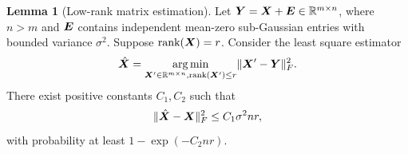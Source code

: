 \documentclass[journal]{IEEEtran}
\theoremstyle{definition}
\newtheorem{lem}{Lemma}
\theoremstyle{definition}
\begin{document}
\begin{lem}[Low-rank matrix estimation] \label{lem:lowrank} Let $\bm Y = \bm X + \bm{E} \in \mathbb{R}^{m \times n}$, where {$n > m$ and} $\bm{E}$ contains independent mean-zero sub-Gaussian entries with bounded variance $\sigma^2$. Suppose $\text{rank}(\bm X) = r$. Consider the least square estimator 
        \begin{equation}
            \hat {\bm X} = \operatorname*{arg\,min}_{\bm X' \in \mathbb{R}^{m \times n}, \text{rank}(\bm X') \leq r} \lVert\bm X' - \bm Y\rVert_F^2.
        \end{equation}
        There exist positive constants $C_1, C_2$ such that
        \begin{equation}
            \lVert\hat {\bm X} - \bm X\rVert_F^2 \leq C_1 \sigma^2 nr,
        \end{equation}
        with probability at least $1 - \exp(-C_2 nr)$.

        \end{lem}
\end{document}
